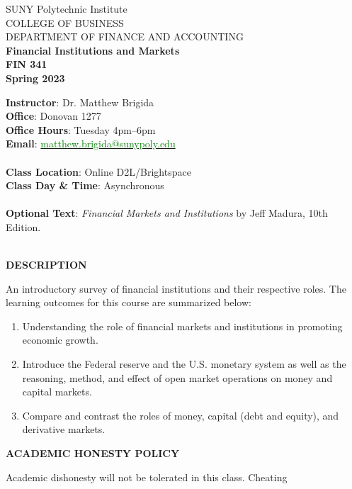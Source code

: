 \documentclass{article}
\begin{document}
\begin{center}
SUNY Polytechnic Institute \\
COLLEGE OF BUSINESS\\
DEPARTMENT OF FINANCE AND ACCOUNTING
\\
{\bf Financial Institutions and Markets}\\
{\bf FIN 341}\\
{\bf Spring 2023}\\
\end{center}
\vspace*{5pt}
{\bf Instructor}: Dr. Matthew Brigida\\
{\bf Office}: Donovan 1277\\
{\bf Office Hours}: Tuesday 4pm--6pm \\
{\bf Email}: \href{mailto:matthew.brigida@sunypoly.edu}{\textcolor{green}{matthew.brigida@sunypoly.edu}}\\
\\
{\bf Class Location}:  Online D2L/Brightspace\\
{\bf Class Day \& Time}: Asynchronous \\
\\
{\bf Optional Text}: {\it Financial Markets and Institutions} by Jeff Madura, 10th Edition.
\\
\\
\begin{center}
{\bf DESCRIPTION}
\end{center}  
An introductory survey of financial institutions and their respective roles. The
learning outcomes for this course are summarized below:
\begin{enumerate}
\item  Understanding the role of financial markets and institutions in promoting economic
growth. 
\item Introduce the Federal reserve and the U.S. monetary system as well as the reasoning,
method, and effect of open market operations on money and capital markets.
\item Compare and contrast the roles of money, capital (debt and equity), and derivative markets.
\end{enumerate}
\begin{center}
{\bf ACADEMIC HONESTY POLICY}
\end{center} 
Academic dishonesty will not be tolerated in this class. Cheating
\end{document}
